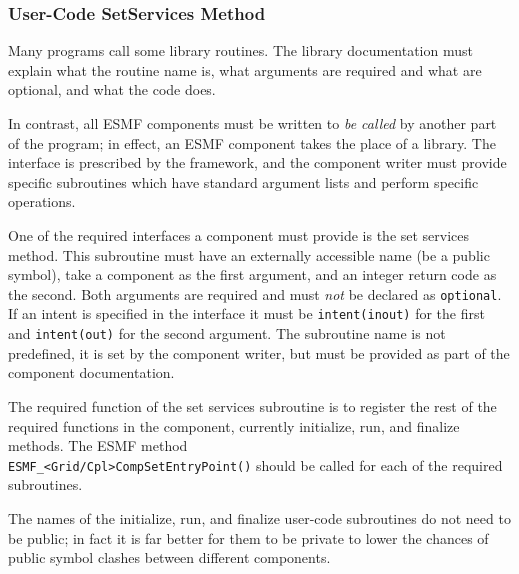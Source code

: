 %

\subsubsection{User-Code SetServices Method}

Many programs call some library routines.  The library
documentation must explain what the routine name is, what arguments 
are required and what are optional, and what the code does.  

In contrast, all ESMF components must be written to {\it be called}
by another part of the program; in effect, an ESMF component takes the 
place of a library.  The interface is prescribed by the framework,
and the component writer must provide specific subroutines which 
have standard argument lists and perform specific operations.

One of the required interfaces a component must provide is 
the set services method.  This subroutine must have an
externally accessible name (be a public symbol), take a component
as the first argument, and an integer return code as the second. 
Both arguments are required and must {\em not} be declared as 
{\tt optional}. If an intent is specified in the interface it must be 
{\tt intent(inout)} for the first and {\tt intent(out)} for the 
second argument. The subroutine name is not predefined, it is set by the component writer, but must be provided as part of the component 
documentation.

The required function of the set services subroutine is to
register the rest of the required functions in the component,
currently initialize, run, and finalize methods.  The ESMF method \\
{\tt ESMF\_<Grid/Cpl>CompSetEntryPoint()} should be called for
each of the required subroutines.  

The names of the initialize, run, and finalize user-code 
subroutines do not need to be public; in fact it is far better 
for them to be private to lower the chances of public symbol clashes 
between different components.

